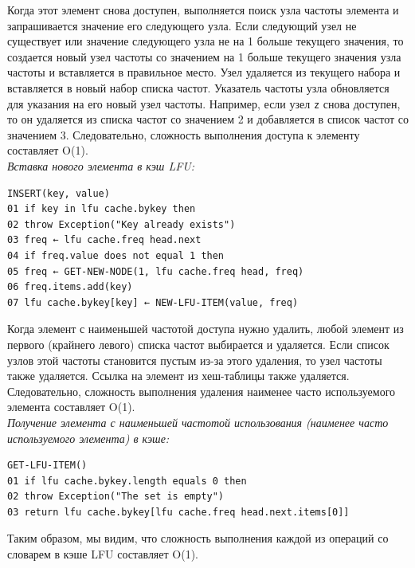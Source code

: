 \documentclass[a4paper, 12pt]{article}
\begin{document}
Когда этот элемент снова доступен, выполняется поиск узла частоты элемента и запрашивается значение его следующего узла. Если следующий узел не существует или значение следующего узла не на 1 больше текущего значения, то создается новый узел частоты со значением на 1 больше текущего значения узла частоты и вставляется в правильное место. Узел удаляется из текущего набора и вставляется в новый набор списка частот. Указатель частоты узла обновляется для указания на его новый узел частоты. Например, если узел \texttt{z} снова доступен, то он удаляется из списка частот со значением 2 и добавляется в список частот со значением 3. Следовательно, сложность выполнения доступа к элементу составляет O(1).\\

\textit{Вставка нового элемента в кэш LFU:}
\begin{verbatim}
INSERT(key, value)
01 if key in lfu cache.bykey then
02 throw Exception("Key already exists")
03 freq ← lfu cache.freq head.next
04 if freq.value does not equal 1 then
05 freq ← GET-NEW-NODE(1, lfu cache.freq head, freq)
06 freq.items.add(key)
07 lfu cache.bykey[key] ← NEW-LFU-ITEM(value, freq)
\end{verbatim}

Когда элемент с наименьшей частотой доступа нужно удалить, любой элемент из первого (крайнего левого) списка частот выбирается и удаляется. Если список узлов этой частоты становится пустым из-за этого удаления, то узел частоты также удаляется. Ссылка на элемент из хеш-таблицы также удаляется. Следовательно, сложность выполнения удаления наименее часто используемого элемента составляет O(1). \\ 

\textit{Получение элемента с наименьшей частотой использования (наименее часто используемого элемента) в кэше:}
\begin{verbatim}
GET-LFU-ITEM()
01 if lfu cache.bykey.length equals 0 then
02 throw Exception("The set is empty")
03 return lfu cache.bykey[lfu cache.freq head.next.items[0]]
\end{verbatim}

Таким образом, мы видим, что сложность выполнения каждой из операций со словарем в кэше LFU составляет O(1).
\end{document}
